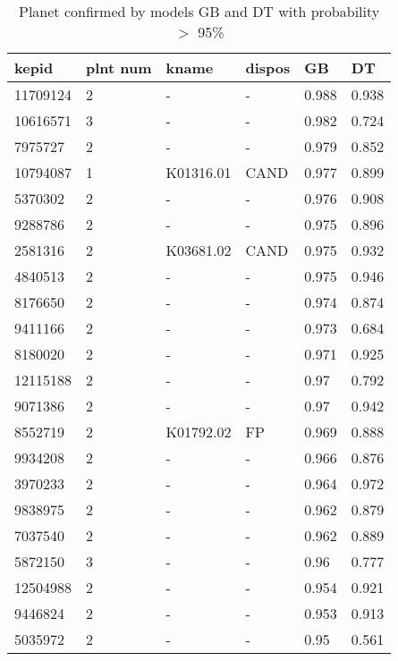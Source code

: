 \begin{table}[!htbp]
 \centering
 \caption{Planet confirmed by models GB and DT with probability $>$ 95\%}
 \label{dataGBDTcreftab} 
  \begin{tabular}
{| 
 p{}| 
 p{}| 
 p{}| 
 p{}| 
 p{}| 
 p{}| 
}\hline 
\textbf{kepid} &\textbf{plnt num} &\textbf{kname} &\textbf{dispos} &\textbf{GB} &\textbf{DT} \\ \hline 
11709124 &2 &- &- &0.988 &0.938 \\ \hline 
10616571 &3 &- &- &0.982 &0.724 \\ \hline 
7975727 &2 &- &- &0.979 &0.852 \\ \hline 
10794087 &1 &K01316.01 &CAND &0.977 &0.899 \\ \hline 
5370302 &2 &- &- &0.976 &0.908 \\ \hline 
9288786 &2 &- &- &0.975 &0.896 \\ \hline 
2581316 &2 &K03681.02 &CAND &0.975 &0.932 \\ \hline 
4840513 &2 &- &- &0.975 &0.946 \\ \hline 
8176650 &2 &- &- &0.974 &0.874 \\ \hline 
9411166 &2 &- &- &0.973 &0.684 \\ \hline 
8180020 &2 &- &- &0.971 &0.925 \\ \hline 
12115188 &2 &- &- &0.97 &0.792 \\ \hline 
9071386 &2 &- &- &0.97 &0.942 \\ \hline 
8552719 &2 &K01792.02 &FP &0.969 &0.888 \\ \hline 
9934208 &2 &- &- &0.966 &0.876 \\ \hline 
3970233 &2 &- &- &0.964 &0.972 \\ \hline 
9838975 &2 &- &- &0.962 &0.879 \\ \hline 
7037540 &2 &- &- &0.962 &0.889 \\ \hline 
5872150 &3 &- &- &0.96 &0.777 \\ \hline 
12504988 &2 &- &- &0.954 &0.921 \\ \hline 
9446824 &2 &- &- &0.953 &0.913 \\ \hline 
5035972 &2 &- &- &0.95 &0.561 \\ \hline 
\end{tabular} 
\end{table}